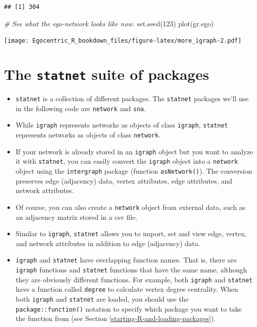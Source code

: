 \documentclass[
]{book}
\newenvironment{Shaded}{\begin{snugshade}}{\end{snugshade}}
\newcommand{\CommentTok}[1]{\textcolor[rgb]{0.56,0.35,0.01}{\textit{#1}}}
\newcommand{\DecValTok}[1]{\textcolor[rgb]{0.00,0.00,0.81}{#1}}
\newcommand{\FunctionTok}[1]{\textcolor[rgb]{0.00,0.00,0.00}{#1}}
\newcommand{\NormalTok}[1]{#1}
\providecommand{\tightlist}{%
  \setlength{\itemsep}{0pt}\setlength{\parskip}{0pt}}
\begin{document}
\begin{verbatim}
## [1] 304
\end{verbatim}

\begin{Shaded}
\begin{Highlighting}[]
\CommentTok{\# See what the ego{-}network looks like now.}
\FunctionTok{set.seed}\NormalTok{(}\DecValTok{123}\NormalTok{)}
\FunctionTok{plot}\NormalTok{(gr.ego)}
\end{Highlighting}
\end{Shaded}

\texttt{[image: Egocentric\_R\_bookdown\_files/figure-latex/more\_igraph-2.pdf]}

\hypertarget{statnet}{%
\section{\texorpdfstring{The \texttt{statnet} suite of packages}{The statnet suite of packages}}\label{statnet}}

\begin{itemize}
\tightlist
\item
  \texttt{statnet} is a collection of different packages. The \texttt{statnet} packages we'll use in the following code are \texttt{network} and \texttt{sna}.
\item
  While \texttt{igraph} represents networks as objects of class \texttt{igraph}, \texttt{statnet} represents networks as objects of class \texttt{network}.
\item
  If your network is already stored in an \texttt{igraph} object but you want to analyze it with \texttt{statnet}, you can easily convert the \texttt{igraph} object into a \texttt{network} object using the \texttt{intergraph} package (function \texttt{asNetwork()}). The conversion preserves edge (adjacency) data, vertex attributes, edge attributes, and network attributes.
\item
  Of course, you can also create a \texttt{network} object from external data, such as an adjacency matrix stored in a csv file.
\item
  Similar to \texttt{igraph}, \texttt{statnet} allows you to import, set and view edge, vertex, and network attributes in addition to edge (adjacency) data.
\item
  \texttt{igraph} and \texttt{statnet} have overlapping function names. That is, there are \texttt{igraph} functions and \texttt{statnet} functions that have the same name, although they are obviously different functions. For example, both \texttt{igraph} and \texttt{statnet} have a function called \texttt{degree} to calculate vertex degree centrality. When both \texttt{igraph} and \texttt{statnet} are loaded, you should use the \texttt{package::function()} notation to specify which package you want to take the function from (see Section \ref{starting-R-and-loading-packages}).
\end{itemize}
\end{document}
